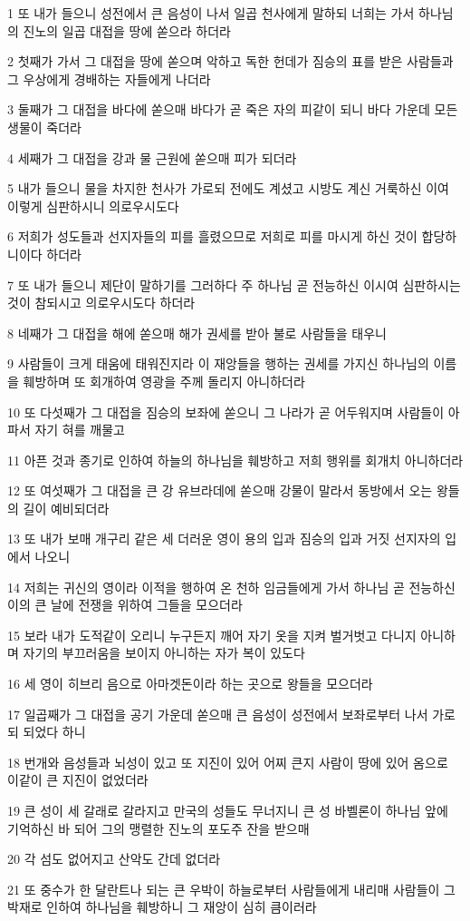 \par 1 또 내가 들으니 성전에서 큰 음성이 나서 일곱 천사에게 말하되 너희는 가서 하나님의 진노의 일곱 대접을 땅에 쏟으라 하더라
\par 2 첫째가 가서 그 대접을 땅에 쏟으며 악하고 독한 헌데가 짐승의 표를 받은 사람들과 그 우상에게 경배하는 자들에게 나더라
\par 3 둘째가 그 대접을 바다에 쏟으매 바다가 곧 죽은 자의 피같이 되니 바다 가운데 모든 생물이 죽더라
\par 4 세째가 그 대접을 강과 물 근원에 쏟으매 피가 되더라
\par 5 내가 들으니 물을 차지한 천사가 가로되 전에도 계셨고 시방도 계신 거룩하신 이여 이렇게 심판하시니 의로우시도다
\par 6 저희가 성도들과 선지자들의 피를 흘렸으므로 저희로 피를 마시게 하신 것이 합당하니이다 하더라
\par 7 또 내가 들으니 제단이 말하기를 그러하다 주 하나님 곧 전능하신 이시여 심판하시는 것이 참되시고 의로우시도다 하더라
\par 8 네째가 그 대접을 해에 쏟으매 해가 권세를 받아 불로 사람들을 태우니
\par 9 사람들이 크게 태움에 태워진지라 이 재앙들을 행하는 권세를 가지신 하나님의 이름을 훼방하며 또 회개하여 영광을 주께 돌리지 아니하더라
\par 10 또 다섯째가 그 대접을 짐승의 보좌에 쏟으니 그 나라가 곧 어두워지며 사람들이 아파서 자기 혀를 깨물고
\par 11 아픈 것과 종기로 인하여 하늘의 하나님을 훼방하고 저희 행위를 회개치 아니하더라
\par 12 또 여섯째가 그 대접을 큰 강 유브라데에 쏟으매 강물이 말라서 동방에서 오는 왕들의 길이 예비되더라
\par 13 또 내가 보매 개구리 같은 세 더러운 영이 용의 입과 짐승의 입과 거짓 선지자의 입에서 나오니
\par 14 저희는 귀신의 영이라 이적을 행하여 온 천하 임금들에게 가서 하나님 곧 전능하신 이의 큰 날에 전쟁을 위하여 그들을 모으더라
\par 15 보라 내가 도적같이 오리니 누구든지 깨어 자기 옷을 지켜 벌거벗고 다니지 아니하며 자기의 부끄러움을 보이지 아니하는 자가 복이 있도다
\par 16 세 영이 히브리 음으로 아마겟돈이라 하는 곳으로 왕들을 모으더라
\par 17 일곱째가 그 대접을 공기 가운데 쏟으매 큰 음성이 성전에서 보좌로부터 나서 가로되 되었다 하니
\par 18 번개와 음성들과 뇌성이 있고 또 지진이 있어 어찌 큰지 사람이 땅에 있어 옴으로 이같이 큰 지진이 없었더라
\par 19 큰 성이 세 갈래로 갈라지고 만국의 성들도 무너지니 큰 성 바벨론이 하나님 앞에 기억하신 바 되어 그의 맹렬한 진노의 포도주 잔을 받으매
\par 20 각 섬도 없어지고 산악도 간데 없더라
\par 21 또 중수가 한 달란트나 되는 큰 우박이 하늘로부터 사람들에게 내리매 사람들이 그 박재로 인하여 하나님을 훼방하니 그 재앙이 심히 큼이러라

